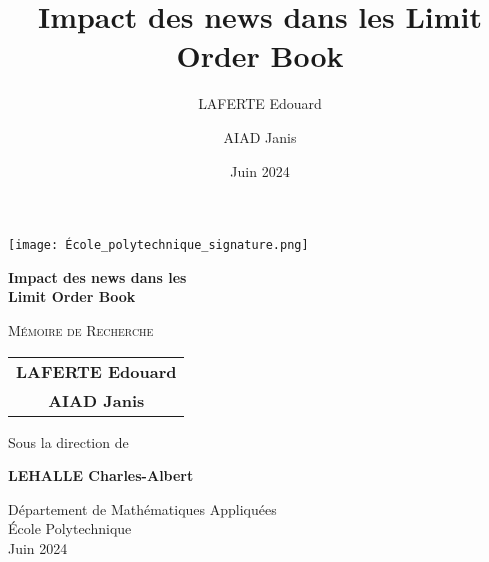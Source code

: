 \documentclass[12pt,a4paper]{article}
\title{\huge\textbf{Impact des news dans les Limit Order Book}}
\author{LAFERTE Edouard \and AIAD Janis}
\date{Juin 2024}
\theoremstyle{definition}
\theoremstyle{remark}
\begin{document}
    \begin{titlepage}
        \begin{center}
            \vspace*{2cm}
            
            \texttt{[image: École\_polytechnique\_signature.png]}
            
            \vspace{2cm}
            
            {\huge\bfseries Impact des news dans les\\[0.4cm] 
            Limit Order Book\par}
            
            \vspace{2cm}
            
            {\Large\textsc{Mémoire de Recherche}\par}
            \vspace{1.5cm}
            
            {\large
            \begin{tabular}{c}
                \textbf{LAFERTE Edouard}\\[0.2cm]
                \textbf{AIAD Janis}
            \end{tabular}\par}
            
            \vspace{1.5cm}
            
            {\large Sous la direction de\par}
            \vspace{0.4cm}
            {\large\textbf{LEHALLE Charles-Albert}\par}
            
            \vfill
            
            {\large Département de Mathématiques Appliquées\\
            École Polytechnique\\[0.4cm]
            Juin 2024\par}
        \end{center}
    \end{titlepage}

    \newpage
    \null
    \thispagestyle{empty}
    \newpage
\end{document}
